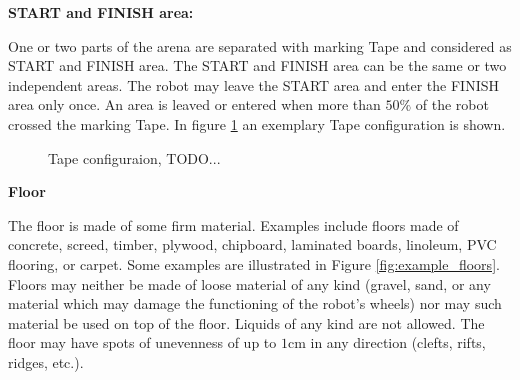 \textbf{START and FINISH area:}
\label{subsubsec: Start and Goal Area}

One or two parts of the arena are separated with marking Tape and considered as START and FINISH area. The START and FINISH area can be the same or two independent areas. The robot may leave the START area and enter the FINISH area only once. An area is leaved or entered when more than $50\%$ of the robot crossed the marking Tape. In figure \ref{fig:tapeconfig} an exemplary Tape configuration is shown.

\begin{figure} [h!]
	\begin{center}
		\missingfigure[figwidth=6cm]{}	
	\end{center}
	\caption{Tape configuraion, TODO...}
	\label{fig:tapeconfig}
\end{figure}

\textbf{Floor}

The floor is made of some firm material. Examples include floors made of concrete, screed, timber, plywood, chipboard, laminated boards, linoleum, PVC flooring, or carpet. Some examples are illustrated in Figure \ref{fig:example_floors}. Floors may neither be made of loose material of any kind (gravel, sand, or any material which may damage the functioning of the robot's wheels) nor may such material be used on top of the floor. Liquids of any kind are not allowed. The floor may have spots of unevenness of up to $1\si{\centi\meter}$ in any direction (clefts, rifts, ridges, etc.).


